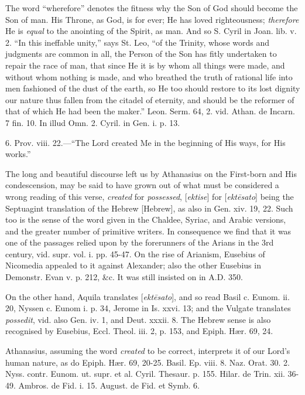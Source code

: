 The word ``wherefore'' denotes the fitness why the
Son of God should become the Son of man. His Throne, as God, is for
ever; He has loved righteousness; \emph{therefore} He is \emph{equal}
to the anointing of the Spirit, as man. And so S. Cyril in Joan. lib.
v. 2. ``In this ineffable unity,'' says St. Leo, ``of the Trinity, whose
words and judgments are common in all, the Person of the Son has fitly
undertaken to repair the race of man, that since He it is by whom all
things were made, and without whom nothing is made, and who breathed
the truth of rational life into men fashioned of the dust of the
earth, so He too should restore to its lost dignity our nature thus
fallen from the citadel of eternity, and should be the reformer of
that of which He had been the maker.'' Leon. Serm. 64, 2. vid. Athan.
de Incarn. 7 fin. 10. In illud Omn. 2. Cyril. in Gen. i. p. 13.

6. Prov. viii. 22.—``The Lord created Me in the
beginning of His ways, for His works.''

The long and beautiful discourse left us by
Athanasius on the First-born and His condescension, may be said to
have grown out of what must be considered a wrong reading of this
verse, \emph{created} for \emph{possessed}, [\emph{ektise}] for [\emph{ekt\={e}sato}]
being the Septuagint translation of the Hebrew [Hebrew],
as also in Gen. xiv. 19, 22. Such too is the sense of the word given
in the Chaldee, Syriac, and Arabic versions, and the greater number of
primitive writers. In consequence we find that it was one of the
passages relied upon by the forerunners of the Arians in the 3rd
century, vid. supr. vol. i. pp. 45-47. On the rise of Arianism,
Eusebius of Nicomedia appealed to it against Alexander; also the other
Eusebius in Demonstr. Evan v. p. 212, \&c. It was still insisted on
in A.D. 350.

On the other hand, Aquila translates [\emph{ekt\={e}sato}],
and so read Basil c. Eunom. ii. 20, Nyssen c. Eunom i. p. 34, Jerome
in Is. xxvi. 13; and the Vulgate translates \emph{possedit}, vid. also
Gen. iv. 1, and Deut. xxxii. 8. The Hebrew sense is also recognised by
Eusebius, Eccl. Theol. iii. 2, p. 153, and Epiph. Hær. 69, 24.

Athanasius, assuming the word \emph{created} to
be correct, interprets it of our Lord's human nature, as do Epiph. Hær.
69, 20-25. Basil. Ep. viii. 8. Naz. Orat. 30. 2. Nyss. contr. Eunom.
ut. supr. et al. Cyril. Thesaur. p. 155. Hilar. de Trin. xii. 36-49.
Ambros. de Fid. i. 15. August. de Fid. et Symb. 6.


